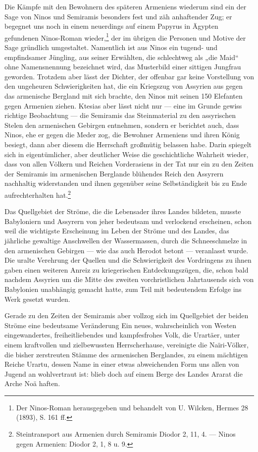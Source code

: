 \documentclass[a4paper, 11pt, oneside, polutonikogreek, german]{article}
\begin{document}
Die Kämpfe mit den Bewohnern des späteren Armeniens wiederum sind ein der Sage von Ninos und Semiramis besonders fest und zäh anhaftender Zug; er begegnet uns noch in einem neuerdings auf einem Papyrus in Ägypten gefundenen Ninos-Roman wieder,\footnote{Der Ninos-Roman herausgegeben und behandelt von U. Wilcken, Hermes 28 (1893), S. 161 ff.} der im übrigen die Personen und Motive der Sage gründlich umgestaltet. Namentlich ist aus Ninos ein tugend- und empfindsamer Jüngling, aus seiner Erwählten, die schlechtweg als „die Maid“ ohne Namensnennung bezeichnet wird, das Musterbild einer sittigen Jungfrau geworden. Trotzdem aber lässt der Dichter, der offenbar gar keine Vorstellung von den ungeheuren Schwierigkeiten hat, die ein Kriegszug von Assyrien aus gegen das armenische Bergland mit sich brachte, den Ninos mit seinen 150 Elefanten gegen Armenien ziehen. Ktesias aber lässt nicht nur --- eine im Grunde gewiss richtige Beobachtung --- die Semiramis das Steinmaterial zu den assyrischen Stelen den armenischen Gebirgen entnehmen, sondern er berichtet auch, dass Ninos, ehe er gegen die Meder zog, die Bewohner Armeniens und ihren König besiegt, dann aber diesem die Herrschaft großmütig belassen habe. Darin spiegelt sich in eigentümlicher, aber deutlicher Weise die geschichtliche Wahrheit wieder, dass von allen Völkern und Reichen Vorderasiens in der Tat nur ein zu den Zeiten der Semiramis im armenischen Berglande blühendes Reich den Assyrern nachhaltig widerstanden und ihnen gegenüber seine Selbständigkeit bis zu Ende aufrechterhalten hat.\footnote{Steintransport aus Armenien durch Semiramis Diodor 2, 11, 4. --- Ninos gegen Armenien: Diodor 2, 1, 8 u. 9.}

Das Quellgebiet der Ströme, die die Lebensader ihres Landes bildeten, musste Babyloniern und Assyrern von jeher bedeutsam und verlockend erscheinen, schon weil die wichtigste Erscheinung im Leben der Ströme und des Landes, das jährliche gewaltige Anschwellen der Wassermassen, durch die Schneeschmelze in den armenischen Gebirgen --- wie das auch Herodot betont --- veranlasst wurde. Die uralte Verehrung der Quellen und die Schwierigkeit des Vordringens zu ihnen gaben einen weiteren Anreiz zu kriegerischen Entdeckungszügen, die, schon bald nachdem Assyrien um die Mitte des zweiten vorchristlichen Jahrtausends sich von Babylonien unabhängig gemacht hatte, zum Teil mit bedeutendem Erfolge ins Werk gesetzt wurden.

Gerade zu den Zeiten der Semiramis aber vollzog sich im Quellgebiet der beiden Ströme eine bedeutsame Veränderung Ein neues, wahrscheinlich von Westen eingewandertes, freiheitliebendes und kampfesfrohes Volk, die Urartäer, unter einem kraftvollen und zielbewussten Herrscherhause, vereinigte die Naïri-Völker, die bisher zerstreuten Stämme des armenischen Berglandes, zu einem mächtigen Reiche Urartu, dessen Name in einer etwas abweichenden Form uns allen von Jugend an wohlvertraut ist: blieb doch auf einem Berge des Landes Ararat die Arche Noä haften.
\end{document}
